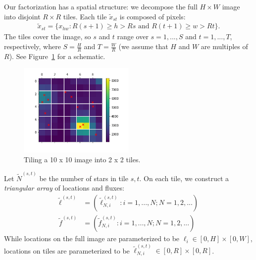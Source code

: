 Our factorization has a spatial structure: we decompose the full $H \times W$ image into disjoint $R \times R$ tiles. Each tile $\tilde x_{st}$ is composed of pixels:
\begin{align}
    \tilde x_{st} = \{x_{hw} : R(s+1) \geq h > Rs \text{ and } R(t+1) \geq w > Rt\}.
    \label{eq:tiles}
\end{align}
The tiles cover the image, so $s$ and $t$ range over $s = 1, ..., S$ and $t = 1, ..., T$, respectively, where $S = \frac{H}{R}$ and $T = \frac{W}{R}$ (we assume that $H$ and $W$ are multiples of $R$). See Figure~\ref{fig:ex_tiles} for a schematic.
\begin{figure}[!h]
    \centering
    \includegraphics[width = 0.5\textwidth]{figures/example_tiled.png}
    \vspace{-1cm}
    \caption{Tiling a 10 x 10 image into 2 x 2 tiles.}
    \label{fig:ex_tiles}
\end{figure}

Let $\tilde N^{(s, t)}$ be the number of stars in tile $s, t$. 
On each tile, we construct a {\itshape triangular array} of locations and fluxes:
\begin{align}
    \tilde\ell^{(s, t)} &= (\tilde\ell_{N, i}^{(s, t)} : i = 1, ..., N; N = 1, 2, ...) \\
    \tilde f^{(s, t)} &= (\tilde f_{N, i}^{(s, t)} : i = 1, ..., N; N = 1, 2, ...)
\end{align}
While locations on the full image are parameterized to be
$\ell_i \in [0, H]\times[0, W]$, locations on tiles are parameterized to be $\tilde\ell_{N, i}^{(s, t)} \in [0, R]\times[0, R]$.

